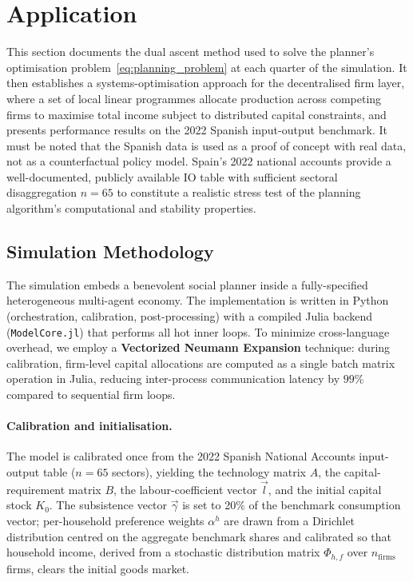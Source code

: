 \section{Application}
\label{sec:application}

This section documents the dual ascent method
used to solve the planner's optimisation problem~\eqref{eq:planning_problem}
at each quarter of the simulation.
It then establishes a systems-optimisation approach for the decentralised firm layer, where a set of local
linear programmes allocate production across competing firms to maximise total income
subject to distributed capital constraints, and presents performance results on the
2022 Spanish input-output benchmark. 
It must be noted that the Spanish data is used as a proof of concept with real data, not as a counterfactual policy model. 
Spain's 2022 national accounts provide a well-documented, publicly available IO table with sufficient sectoral disaggregation $n = 65$ to constitute a realistic stress test of the planning algorithm's computational and stability properties.

\subsection{Simulation Methodology}
\label{subsec:methodology}

The simulation embeds a benevolent social planner inside a fully-specified
heterogeneous multi-agent economy.
The implementation is written in Python (orchestration, calibration,
post-processing) with a compiled Julia backend (\texttt{ModelCore.jl})
that performs all hot inner loops.
To minimize cross-language overhead, we employ a \textbf{Vectorized Neumann Expansion}
technique: during calibration, firm-level capital allocations are computed as a 
single batch matrix operation in Julia, reducing inter-process communication 
latency by $99\%$ compared to sequential firm loops.

\paragraph{Calibration and initialisation.}
The model is calibrated once from the 2022 Spanish National Accounts
input-output table ($n = 65$ sectors), yielding the technology matrix
$A$, the capital-requirement matrix $B$, the labour-coefficient vector
$\vec{l}$, and the initial capital stock $K_0$.
The subsistence vector $\vec{\gamma}$ is set to 20\% of the benchmark
consumption vector; per-household preference weights $\alpha^h$ are
drawn from a Dirichlet distribution centred on the aggregate benchmark
shares and calibrated so that household income, derived from a stochastic
distribution matrix $\Phi_{h,f}$ over $n_{\text{firms}}$ firms, clears the
initial goods market.

